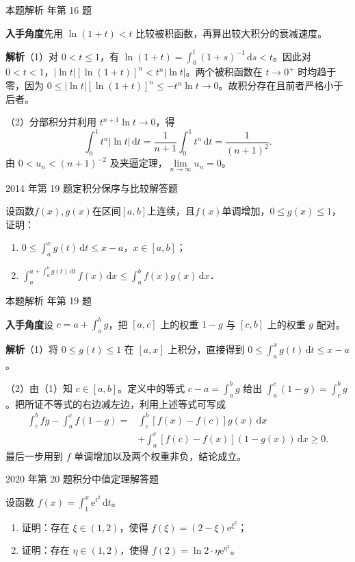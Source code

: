 \documentclass[UTF8,zihao=-4,fontset=fandol]{ctexart}
\renewcommand{\lim}{\operatorname*{lim}\limits}
\newcommand{\QuestionPage}[6]{%
  \par\noindent\begin{minipage}{\linewidth}
  \raggedright
  {\small\textcolor{black!60}{#3\quad #5}\hfill\textcolor{accent}{#2}}\par\smallskip}
\newcommand{\QuestionEnd}{\end{minipage}\par\medskip}
\newcommand{\QuestionPage}[6]{%
  \clearpage
  {\small\textcolor{accent}{#1\hfill #2}}\par\medskip
  {\small\textcolor{black!60}{#3\quad #5\hfill #6}}\par\vspace{9bp}}
\newcommand{\QuestionEnd}{}
\newenvironment{QuestionSolution}[1]{%
  \clearpage
  {\small\textcolor{black!60}{本题解析\quad #1}}\par\medskip
}{\par\clearpage}
\begin{document}
\begin{QuestionSolution}{2010 年第 16 题}
\textbf{入手角度}\quad 先用 \(\ln(1+t)<t\) 比较被积函数，再算出较大积分的衰减速度。

\textbf{解析}\quad （1）对 \(0<t\le1\)，有 \(\ln(1+t)=\int_0^t (1+s)^{-1}\,\mathrm{d}s<t\)。因此对 \(0<t<1\)，\(|\ln t|[\ln(1+t)]^n<t^n|\ln t|\)。两个被积函数在 \(t\to0^+\) 时均趋于零，因为 \(0\le|\ln t|[\ln(1+t)]^n\le-t^n\ln t\to0\)。故积分存在且前者严格小于后者。

（2）分部积分并利用 \(t^{n+1}\ln t\to0\)，得
\[
\int_0^1 t^n|\ln t|\,\mathrm{d}t
=\frac1{n+1}\int_0^1 t^n\,\mathrm{d}t=\frac1{(n+1)^2}.
\]
由 \(0<u_n<(n+1)^{-2}\) 及夹逼定理，\(\lim_{n\to\infty}u_n=\boxed{0}\)。
\end{QuestionSolution}

\QuestionPage{3.1 定积分的概念、存在条件与性质}{解答题}{2014 年第 19 题}{3}{定积分保序与比较}{139 / 234}
设函数$f(x),g(x)$在区间$[a,b]$上连续，且$f(x)$单调增加，$0 \le g(x) \le 1$，证明：
\begin{enumerate}
\item $0 \le \int_a^x g(t)\,\mathrm{d} t \le x - a$，$x \in [a,b]$；
\item $\int_a^{a + \int_a^b g(t)\,\mathrm{d} t} f(x)\,\mathrm{d} x \le \int_a^b f(x)g(x)\,\mathrm{d} x$．
\end{enumerate}
\QuestionEnd

\begin{QuestionSolution}{2014 年第 19 题}
\textbf{入手角度}\quad 设 \(c=a+\int_a^b g\)，把 \([a,c]\) 上的权重 \(1-g\) 与 \([c,b]\) 上的权重 \(g\) 配对。

\textbf{解析}\quad （1）将 \(0\le g(t)\le1\) 在 \([a,x]\) 上积分，直接得到 \(0\le\int_a^x g(t)\,\mathrm{d}t\le x-a\)。

（2）由（1）知 \(c\in[a,b]\)。定义中的等式 \(c-a=\int_a^b g\) 给出 \(\int_a^c(1-g)=\int_c^b g\)。把所证不等式的右边减左边，利用上述等式可写成
\[
\begin{aligned}
\int_c^b f g-\int_a^c f(1-g)
={}&\int_c^b [f(x)-f(c)]g(x)\,\mathrm{d}x\\
&+\int_a^c [f(c)-f(x)](1-g(x))\,\mathrm{d}x\ge0 .
\end{aligned}
\]
最后一步用到 \(f\) 单调增加以及两个权重非负，结论成立。
\end{QuestionSolution}

\QuestionPage{3.1 定积分的概念、存在条件与性质}{解答题}{2020 年第 20 题}{3}{积分中值定理}{140 / 234}
设函数 \(f\left( x \right)=\int_{1}^{x}{\mathrm{e}^{t^{2}} \,\mathrm{d} t}\)。
\begin{enumerate}
\item 证明：存在 \(\xi \in \left( 1,2 \right)\)，使得 \(f\left( \xi \right)=\left( 2-\xi \right)\mathrm{e}^{\xi^{2}}\)；
\item 证明：存在 \(\eta \in \left( 1,2 \right)\)，使得 \(f\left( 2 \right)=\ln 2 \cdot \eta \mathrm{e}^{\eta^{2}}\)。
\end{enumerate}
\QuestionEnd
\end{document}

